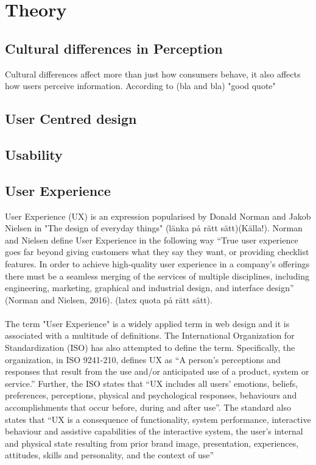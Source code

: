 
\chapter{Theory} %

\label{Theory} %




\section{Cultural differences in Perception}
Cultural differences affect more than just how consumers behave, it also affects how users perceive information. According to (bla and bla) "good quote" \cite{Holistic_vs_Analytic}
\section{User Centred design}
\section{Usability}
\section{User Experience}
User Experience (UX) is an expression popularised by Donald Norman and Jakob Nielsen in "The design of everyday things" (länka på rätt sätt)(Källa!). Norman and Nielsen define User Experience in the following way “True user experience goes far beyond giving customers what they say they want, or providing checklist features. In order to achieve high-quality user experience in a company’s offerings there must be a seamless merging of the services of multiple disciplines, including engineering, marketing, graphical and industrial design, and interface design” (Norman and Nielsen, 2016). (latex quota på rätt sätt). 
\\\\
The term "User Experience" is a widely applied term in web design and it is associated with a multitude of definitions. The International Organization for Standardization (ISO) has also attempted to define the term. Specifically, the organization, in ISO 9241-210, defines UX as “A person's perceptions and responses that result from the use and/or anticipated use of a product, system or service.” Further, the ISO states that “UX includes all users' emotions, beliefs, preferences, perceptions, physical and psychological responses, behaviours and accomplishments that occur before, during and after use”. The standard also states that “UX is a consequence of functionality, system performance, interactive behaviour and assistive capabilities of the interactive system, the user's internal and physical state resulting from prior brand image, presentation, experiences, attitudes, skills and personality, and the context of use” 


